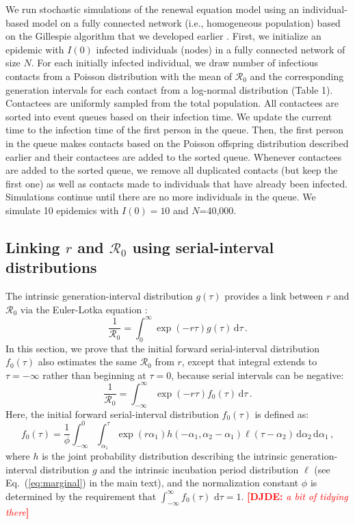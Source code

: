 \documentclass[12pt]{article}
\newcommand{\comment}{\showcomment}
\newcommand{\showcomment}[3]{\textcolor{#1}{\textbf{[#2: }\textsl{#3}\textbf{]}}}
\newcommand{\djde}[1]{\comment{red}{DJDE}{#1}}
\newcommand{\eref}[1]{Eq.~(\ref{eq:#1})}
\newcommand{\Rx}[1]{\ensuremath{{\mathcal R}_{#1}}\xspace}
\newcommand{\Ro}{\Rx{0}}
\newcommand{\dd}[1]{\ensuremath{\, \mathrm{d}#1}}
\newcommand{\dtau}{\dd{\tau}}
\newcommand{\gdist}{g} %
\newcommand{\idist}{\ell} %
\begin{document}
We run stochastic simulations of the renewal equation model using an individual-based model on a fully connected network (i.e., homogeneous population) based on the Gillespie algorithm that we developed earlier \citep{park2019inferring}.
First, we initialize an epidemic with $I(0)$ infected individuals (nodes) in a fully connected network of size $N$. 
For each initially infected individual, we draw number of infectious contacts from a Poisson distribution with the mean of \Ro and the corresponding generation intervals for each contact from a log-normal distribution (Table 1).
Contactees are uniformly sampled from the total population.
All contactees are sorted into event queues based on their infection time.
We update the current time to the infection time of the first person in the queue.
Then, the first person in the queue makes contacts based on the Poisson offspring distribution described earlier and their contactees are added to the sorted queue.
Whenever contactees are added to the sorted queue, we remove all duplicated contacts (but keep the first one) as well as contacts made to individuals that have already been infected.
Simulations continue until there are no more individuals in the queue.
We simulate 10 epidemics with $I(0)=10$ and $N$=40,000.

\subsection{Linking $r$ and \Ro using serial-interval distributions}

The intrinsic generation-interval distribution $\gdist(\tau)$ provides a link between $r$ and \Ro via the Euler-Lotka equation \citep{wallinga2007generation}:
\begin{equation}
\frac{1}{\Ro} = \int_0^\infty \exp(-r\tau) \gdist(\tau) \dtau\,.
\end{equation}
In this section, we prove that the initial forward serial-interval distribution $f_0(\tau)$ also estimates the same \Ro from $r$, except that integral extends to $\tau=-\infty$ rather than beginning at $\tau=0$, because serial intervals can be negative:
\begin{equation}
\frac{1}{\Ro} = \int_{-\infty}^\infty \exp(-r\tau) f_{0}(\tau) \dtau\,.
\label{eq:ptarget}
\end{equation}
Here, the initial forward serial-interval distribution $f_{0}(\tau)$ is defined as:
\begin{equation}
f_{0}(\tau) = \frac{1}{\phi} \int_{-\infty}^{0} \int_{\alpha_1}^{\tau} \exp(r \alpha_1) h(-\alpha_1, \alpha_2 - \alpha_1) \idist(\tau - \alpha_2) \, \mathrm{d}\alpha_2\,\mathrm{d}\alpha_1\,,
\label{eq:fdist}
\end{equation}
where $h$ is the joint probability distribution describing the
intrinsic generation-interval distribution $g$ and the intrinsic
incubation period distribution $\idist$ (see \eref{marginal} in the
main text), and the normalization constant $\phi$ is determined by the
requirement that $\int_{-\infty}^\infty f_{0}(\tau)\,\dtau=1$.
\djde{a bit of tidying there}
\end{document}
